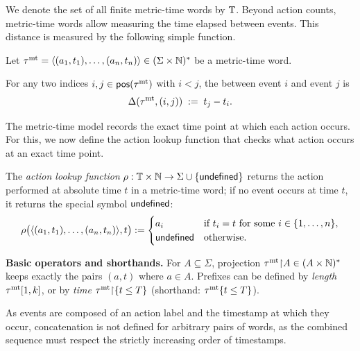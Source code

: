 We denote the set of all finite metric-time words by $\mathbb{T}$. Beyond action counts, metric-time words allow measuring the time elapsed between events. This distance is measured by the following simple function.

 \begin{definition}

 Let $\tau^{\mathrm{mt}}=\langle (a_1,t_1),\dots,(a_{n},t_{n}) \rangle \in(\Sigma\times\mathbb{N})^{*}$ be a metric-time word.

 For any two indices $i,j\in\mathsf{pos}(\tau^{\mathrm{mt}})$ with $i<j$, the  between event $i$ and event $j$ is
 \[
 \Delta(\tau^{\mathrm{mt}},(i,j))\;:=\; t_j-t_i.
 \]
 \end{definition}

The metric-time model records the exact time point at which each action occurs. For this, we now define the action lookup function that checks what action occurs at an exact time point.

 \begin{definition}\label{defrho}

 The \emph{action lookup function} $\rho : \mathbb{T} \times \mathbb{N} \to \Sigma \cup \{ {\mathsf{undefined}} \}$ returns the action performed at absolute time $t$ in a metric-time word; if no event occurs at time $t$, it returns the special symbol ${\mathsf{undefined}}$:
 \[
 \rho\big(\langle (a_1,t_1), \dots, (a_{n},t_{n}) \rangle , t\big) := 
 \begin{cases} 
 a_i & \text{if } t_i=t \text{ for some } i \in \{1,\dots,n\},\\
 {\mathsf{undefined}} & \text{otherwise.}
 \end{cases}
 \]
 \end{definition}


\noindent\textbf{Basic operators and shorthands.}
For \(A\subseteq\Sigma\), projection \( \tau^{\mathrm{mt}}{\upharpoonright}A\in(A\times\mathbb{N})^{*} \) keeps exactly the pairs \((a,t)\) where \(a\in A\).
Prefixes can be defined by \emph{length} \( \tau^{\mathrm{mt}}[1,k] \), or by \emph{time} \( \tau^{\mathrm{mt}}{\upharpoonright}\{t\le T\} \) (shorthand: \( \tau^{\mathrm{mt}}\{t\le T\}\)).

 As events are composed of an action label and the timestamp at which they occur, concatenation is not defined for arbitrary pairs of words, as the combined sequence must respect the strictly increasing order of timestamps.  

